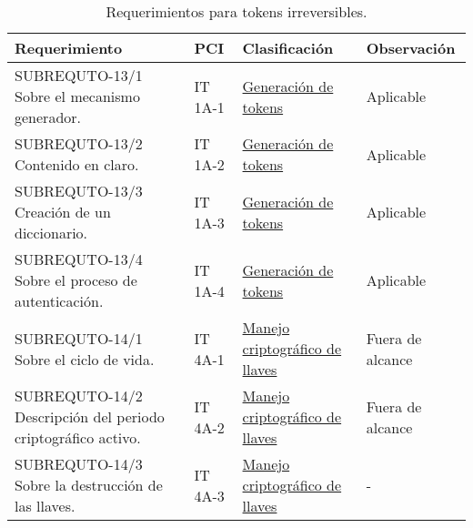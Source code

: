 \begin{table}[H]
  \centering
  \begin{tabular}{| p{5.5cm} | p{2cm} | p{4cm} | p{4cm} |}

    \hline
      \textbf{Requerimiento}    &
      \textbf{PCI}              &
      \textbf{Clasificación}    &
      \textbf{Observación}     \\ [0.8ex]
    \hline

    SUBREQUTO-13/1 Sobre el mecanismo generador.  
    &  IT 1A-1  &  \hyperref[dm:gen_tokens]{Generación de tokens}              &  Aplicable        \\ \hline
    SUBREQUTO-13/2 Contenido en claro.  
    &  IT 1A-2  &  \hyperref[dm:gen_tokens]{Generación de tokens}              &  Aplicable        \\ \hline
    SUBREQUTO-13/3 Creación de un diccionario.  
    &  IT 1A-3  &  \hyperref[dm:gen_tokens]{Generación de tokens}              &  Aplicable        \\ \hline
    SUBREQUTO-13/4 Sobre el proceso de autenticación.  
    &  IT 1A-4  &  \hyperref[dm:gen_tokens]{Generación de tokens}              &  Aplicable        \\ \hline
    SUBREQUTO-14/1 Sobre el ciclo de vida.  
    &  IT 4A-1  &  \hyperref[dm:man_llaves]{Manejo criptográfico de llaves}    &  Fuera de alcance \\ \hline
    SUBREQUTO-14/2 Descripción del periodo criptográfico activo.  
    &  IT 4A-2  &  \hyperref[dm:man_llaves]{Manejo criptográfico de llaves}    &  Fuera de alcance \\ \hline
    SUBREQUTO-14/3 Sobre la destrucción de las llaves.  
    &  IT 4A-3  &  \hyperref[dm:man_llaves]{Manejo criptográfico de llaves}    &  -                \\ \hline

  \end{tabular}
  \caption{Requerimientos para tokens irreversibles.}
\end{table}

